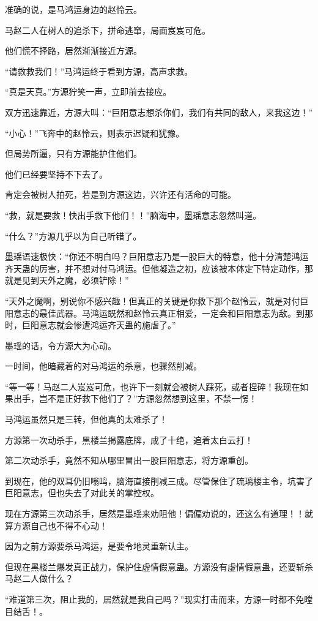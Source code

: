 \begin{this_body}
准确的说，是马鸿运身边的赵怜云。

马赵二人在树人的追杀下，拼命逃窜，局面岌岌可危。

他们慌不择路，居然渐渐接近方源。

“请救救我们！”马鸿运终于看到方源，高声求救。

“真是天真。”方源狞笑一声，立即前去接应。

双方迅速靠近，方源大叫：“巨阳意志想杀你们，我们有共同的敌人，来我这边！”

“小心！”飞奔中的赵怜云，则表示迟疑和犹豫。

但局势所逼，只有方源能护住他们。

他们已经要坚持不下去了。

肯定会被树人拍死，若是到方源这边，兴许还有活命的可能。

“救，就是要救！快出手救下他们！！”脑海中，墨瑶意志忽然叫道。

“什么？”方源几乎以为自己听错了。

墨瑶语速极快：“你还不明白吗？巨阳意志乃是一股巨大的特意，他十分清楚鸿运齐天蛊的厉害，并不想对付马鸿运。但他凝造之初，应该被本体定下特定动作，那就是见到天外之魔，必须铲除！”

“天外之魔啊，别说你不感兴趣！但真正的关键是你救下那个赵怜云，就是对付巨阳意志的最佳武器。马鸿运既然和赵怜云真正相爱，一定会和巨阳意志为敌。到那时，巨阳意志就会惨遭鸿运齐天蛊的施虐了。”

墨瑶的话，令方源大为心动。

一时间，他暗藏着的对马鸿运的杀意，也骤然削减。

“等一等！马赵二人岌岌可危，也许下一刻就会被树人踩死，或者捏碎！我现在如果出手，岂不是正好救下他们了？”方源忽然想到这里，不禁一愣！

马鸿运虽然只是三转，但他真的太难杀了！

方源第一次动杀手，黑楼兰揭露底牌，成了十绝，追着太白云打！

第二次动杀手，竟然不知从哪里冒出一股巨阳意志，将方源重创。

到现在，他的双耳仍旧嗡鸣，脑海直接削减三成。尽管保住了琉璃楼主令，坑害了巨阳意志，但也失去了对此关的掌控权。

现在方源第三次动杀手，居然是墨瑶来劝阻他！偏偏劝说的，还这么有道理！！就算方源自己也不得不心动！

因为之前方源要杀马鸿运，是要令地灵重新认主。

但现在黑楼兰爆发真正战力，保护住虚情假意蛊。方源没有虚情假意蛊，还要斩杀马赵二人做什么？

“难道第三次，阻止我的，居然就是我自己吗？”现实打击而来，方源一时都不免瞠目结舌！。

\end{this_body}

